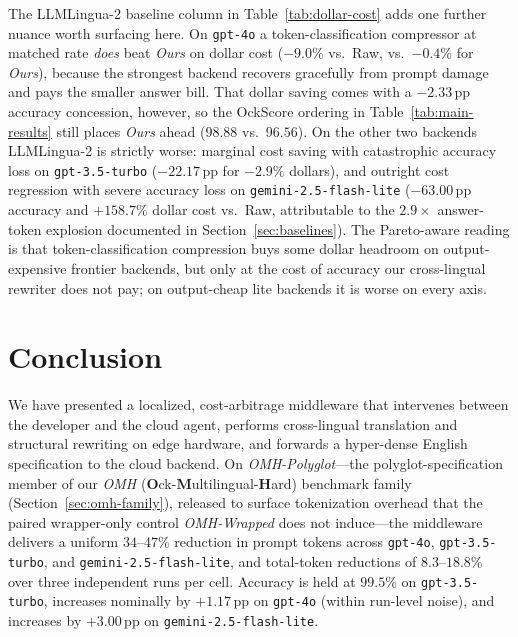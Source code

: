 \documentclass[11pt,a4paper,twocolumn]{article}
\begin{document}
The LLMLingua-2 baseline column in Table~\ref{tab:dollar-cost} adds one further nuance worth surfacing here. On \texttt{gpt-4o} a token-classification compressor at matched rate \emph{does} beat \textit{Ours} on dollar cost ($-9.0\%$ vs.\ Raw, vs.\ $-0.4\%$ for \textit{Ours}), because the strongest backend recovers gracefully from prompt damage and pays the smaller answer bill. That dollar saving comes with a $-2.33$\,pp accuracy concession, however, so the OckScore ordering in Table~\ref{tab:main-results} still places \textit{Ours} ahead ($98.88$ vs.\ $96.56$). On the other two backends LLMLingua-2 is strictly worse: marginal cost saving with catastrophic accuracy loss on \texttt{gpt-3.5-turbo} ($-22.17$\,pp for $-2.9\%$ dollars), and outright cost regression with severe accuracy loss on \texttt{gemini-2.5-flash-lite} ($-63.00$\,pp accuracy and $+158.7\%$ dollar cost vs.\ Raw, attributable to the $2.9\times$ answer-token explosion documented in Section~\ref{sec:baselines}). The Pareto-aware reading is that token-classification compression buys some dollar headroom on output-expensive frontier backends, but only at the cost of accuracy our cross-lingual rewriter does not pay; on output-cheap lite backends it is worse on every axis.

\section{Conclusion}
\label{sec:conclusion}
We have presented a localized, cost-arbitrage middleware that intervenes between the developer and the cloud agent, performs cross-lingual translation and structural rewriting on edge hardware, and forwards a hyper-dense English specification to the cloud backend. On \textit{OMH-Polyglot}---the polyglot-specification member of our \textit{OMH} (\textbf{O}ck-\textbf{M}ultilingual-\textbf{H}ard) benchmark family (Section~\ref{sec:omh-family}), released to surface tokenization overhead that the paired wrapper-only control \textit{OMH-Wrapped} does not induce---the middleware delivers a uniform $34$--$47\%$ reduction in prompt tokens across \texttt{gpt-4o}, \texttt{gpt-3.5-turbo}, and \texttt{gemini-2.5-flash-lite}, and total-token reductions of $8.3$--$18.8\%$ over three independent runs per cell. Accuracy is held at $99.5\%$ on \texttt{gpt-3.5-turbo}, increases nominally by $+1.17$\,pp on \texttt{gpt-4o} (within run-level noise), and increases by $+3.00$\,pp on \texttt{gemini-2.5-flash-lite}.
\end{document}
